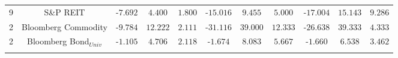 \begin{landscape}
\begin{table}[!htbp]
\begin{adjustbox}{max width=3.5\totalheight}
\begin{tabular}{@{\extracolsep{5pt}} Hcccccccccc}
9 & S\&P REIT & -$7.692$ & $4.400$ & $1.800$ & -$15.016$ & $9.455$ & $5.000$ & -$17.004$ & $15.143$ & $9.286$ \\ 
2 & Bloomberg Commodity & -$9.784$ & $12.222$ & $2.111$ & -$31.116$ & $39.000$ & $12.333$ & -$26.638$ & $39.333$ & $4.333$\\
2 & Bloomberg Bond$_{Univ}$ & -$1.105$ & $4.706$ & $2.118$ & -$1.674$ & $8.083$ & $5.667$ & -$1.660$ & $6.538$ & $3.462$ \\ 
\hline \\[-1.8ex] 
\end{tabular} 
\end{adjustbox}
\end{table} 
\end{landscape}